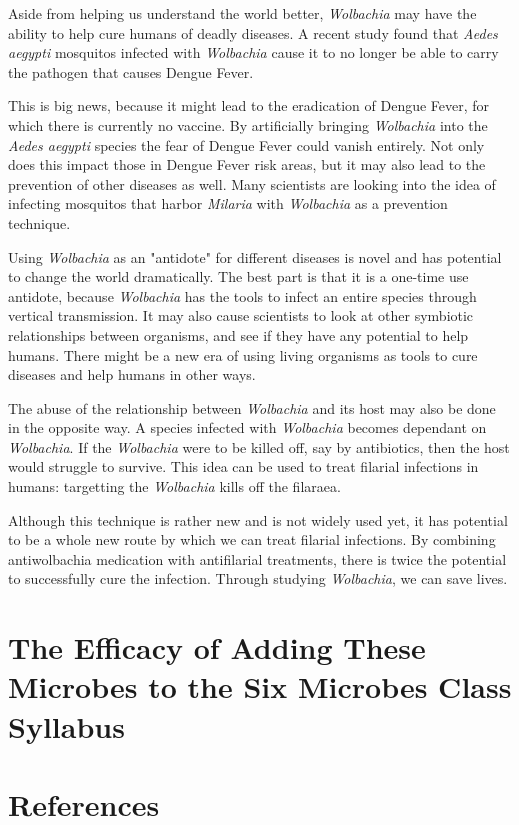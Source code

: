 \documentclass[twocolumn]{article}
\begin{document}
Aside from helping us understand the world better, \textit{Wolbachia} may have the ability to help cure humans of deadly diseases. A recent study found that \textit{Aedes aegypti} mosquitos infected with \textit{Wolbachia} cause it to no longer be able to carry the pathogen that causes Dengue Fever.\cite{Wdengue_fever}

This is big news, because it might lead to the eradication of Dengue Fever, for which there is currently no vaccine. By artificially bringing \textit{Wolbachia} into the \textit{Aedes aegypti} species the fear of Dengue Fever could vanish entirely. Not only does this impact those in Dengue Fever risk areas, but it may also lead to the prevention of other diseases as well. Many scientists are looking into the idea of infecting mosquitos that harbor \textit{Milaria} with \textit{Wolbachia} as a prevention technique.\cite{Wmilaria}

Using \textit{Wolbachia} as an "antidote" for different diseases is novel and has potential to change the world dramatically. The best part is that it is a one-time use antidote, because \textit{Wolbachia} has the tools to infect an entire species through vertical transmission. It may also cause scientists to look at other symbiotic relationships between organisms, and see if they have any potential to help humans. There might be a new era of using living organisms as tools to cure diseases and help humans in other ways.

The abuse of the relationship between \textit{Wolbachia} and its host may also be done in the opposite way. A species infected with \textit{Wolbachia} becomes dependant on \textit{Wolbachia}. If the \textit{Wolbachia} were to be killed off, say by antibiotics, then the host would struggle to survive. This idea can be used to treat filarial infections in humans: targetting the \textit{Wolbachia} kills off the filaraea.\cite{wolbachia}\cite{Wcure_filarial_infection}

Although this technique is rather new and is not widely used yet, it has potential to be a whole new route by which we can treat filarial infections. By combining antiwolbachia medication with antifilarial treatments, there is twice the potential to successfully cure the infection. Through studying \textit{Wolbachia}, we can save lives.


\section*{The Efficacy of Adding These Microbes to the Six Microbes Class Syllabus}

\section*{References}

\printbibliography
\end{document}
